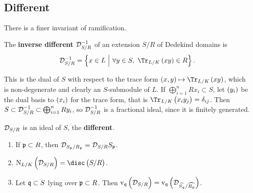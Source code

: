 \pagebreak

\subsection{Different}

There is a finer invariant of ramification.

\begin{definition*}
The \textbf{inverse different} $ \mathcal{D}_{S / R}^{-1} $ of an extension $ S / R $ of Dedekind domains is
$$ \DDD_{S / R}^{-1} = \cbr{x \in L \st \forall y \in S, \ \Tr_{L / K}\br{xy} \in R}. $$
\end{definition*}

This is the dual of $ S $ with respect to the trace form $ \br{x, y} \mapsto \Tr_{L / K}\br{xy} $, which is non-degenerate and clearly an $ S $-submodule of $ L $. If $ \bigoplus_{i = 1}^n Rx_i \subset S $, let $ \br{y_i} $ be the dual basis to $ \br{x_i} $ for the trace form, that is $ \Tr_{L / K}\br{x_iy_j} = \delta_{ij} $. Then $ S \subset \mathcal{D}_{S / R}^{-1} \subset \bigoplus_{i = 1}^n Ry_i $, so $ \mathcal{D}_{S / R}^{-1} $ is a fractional ideal, since it is finitely generated.

\begin{definition*}
$ \mathcal{D}_{S / R} $ is an ideal of $ S $, the \textbf{different}.
\end{definition*}

\begin{proposition}
\label{prop:3.8}
\hfill
\begin{enumerate}
\item If $ \mathfrak{p} \subset R $, then $ \mathcal{D}_{S_{\mathfrak{p}} / R_{\mathfrak{p}}} = \mathcal{D}_{S / R}S_{\mathfrak{p}} $.
\item $ \N_{L / K}\br{\DDD_{S / R}} = \disc\br{S / R} $.
\item Let $ \mathfrak{q} \subset S $ lying over $ \mathfrak{p} \subset R $. Then $ \v_\qqq\br{\DDD_{S / R}} = \v_\qqq\br{\DDD_{\widehat{S_\qqq} / \widehat{R_\ppp}}} $.
\end{enumerate}
\end{proposition}

